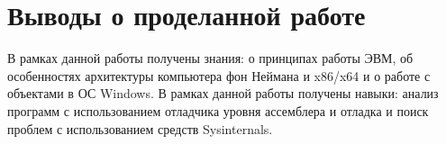 \FloatBarrier



\clearpage






\clearpage



\section{Выводы о проделанной работе}
В рамках данной работы получены знания: о принципах работы ЭВМ, об особенностях архитектуры компьютера фон Неймана и x86/x64 и о работе с объектами в ОС Windows.
В рамках данной работы получены навыки: анализ программ с использованием отладчика уровня ассемблера и отладка и поиск проблем с использованием средств Sysinternals.